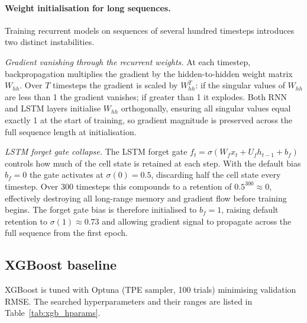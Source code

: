 \documentclass[a4paper,11pt]{article}
\begin{document}
\paragraph{Weight initialisation for long sequences.}
Training recurrent models on sequences of several hundred timesteps introduces two distinct instabilities.

\textit{Gradient vanishing through the recurrent weights.}
At each timestep, backpropagation multiplies the gradient by the hidden-to-hidden weight matrix $W_{hh}$.
Over $T$ timesteps the gradient is scaled by $W_{hh}^{T}$: if the singular values of $W_{hh}$ are less than 1 the gradient vanishes; if greater than 1 it explodes.
Both RNN and LSTM layers initialise $W_{hh}$ orthogonally, ensuring all singular values equal exactly 1 at the start of training, so gradient magnitude is preserved across the full sequence length at initialisation.

\textit{LSTM forget gate collapse.}
The LSTM forget gate $f_t = \sigma(W_f x_t + U_f h_{t-1} + b_f)$ controls how much of the cell state is retained at each step.
With the default bias $b_f = 0$ the gate activates at $\sigma(0) = 0.5$, discarding half the cell state every timestep.
Over 300 timesteps this compounds to a retention of $0.5^{300} \approx 0$, effectively destroying all long-range memory and gradient flow before training begins.
The forget gate bias is therefore initialised to $b_f = 1$, raising default retention to $\sigma(1) \approx 0.73$ and allowing gradient signal to propagate across the full sequence from the first epoch.

\subsection{XGBoost baseline}
XGBoost is tuned with Optuna (TPE sampler, 100 trials) minimising validation RMSE.
The searched hyperparameters and their ranges are listed in Table~\ref{tab:xgb_hparams}.
\end{document}
